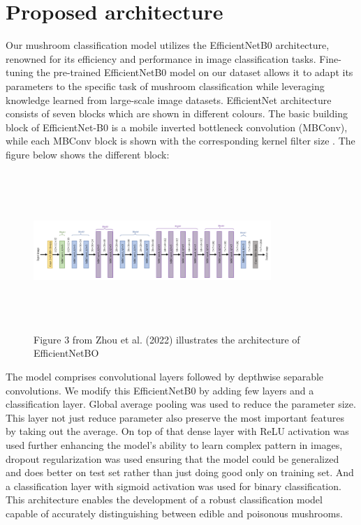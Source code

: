 \section{Proposed architecture}
Our mushroom classification model utilizes the EfficientNetB0 architecture, renowned for its efficiency and performance in image classification tasks. Fine-tuning the pre-trained EfficientNetB0 model on our dataset allows it to adapt its parameters to the specific task of mushroom classification while leveraging knowledge learned from large-scale image datasets.
EfficientNet architecture consists of seven blocks which are shown in different colours. The basic building block of EfficientNet-B0 is a mobile inverted bottleneck convolution (MBConv), while each MBConv block is shown with the corresponding kernel filter size \cite{zhou2022multihead}. The figure below shows the different block:

\begin{figure}[!ht]
    \centering
    \includegraphics[height=6cm, width=9cm]{images/EfficientNet.PNG}
    \caption{Figure 3 from Zhou et al. (2022) illustrates the architecture of EfficientNetBO}
\end{figure}

The model comprises convolutional layers followed by depthwise separable convolutions. We modify this EfficientNetB0 by adding few layers and a classification layer. Global average pooling was used to reduce the parameter size. This layer not just reduce parameter also preserve the most important features by taking out the average. On top of that dense layer with ReLU activation was used further enhancing the model's ability to learn complex pattern in images, dropout regularization was used ensuring that the model could be generalized and does better on test set rather than just doing good only on training set. And a classification layer with sigmoid activation was used for binary classification. This architecture enables the development of a robust classification model capable of accurately distinguishing between edible and poisonous mushrooms.